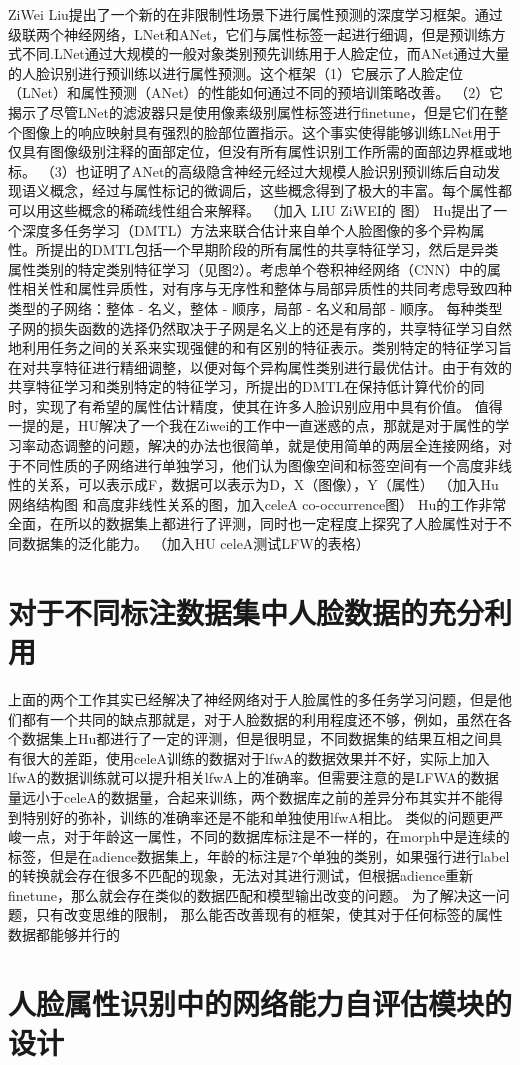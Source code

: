 ZiWei Liu提出了一个新的在非限制性场景下进行属性预测的深度学习框架。通过级联两个神经网络，LNet和ANet，它们与属性标签一起进行细调，但是预训练方式不同.LNet通过大规模的一般对象类别预先训练用于人脸定位，而ANet通过大量的人脸识别进行预训练以进行属性预测。这个框架（1）它展示了人脸定位（LNet）和属性预测（ANet）的性能如何通过不同的预培训策略改善。 （2）它揭示了尽管LNet的滤波器只是使用像素级别属性标签进行finetune，但是它们在整个图像上的响应映射具有强烈的脸部位置指示。这个事实使得能够训练LNet用于仅具有图像级别注释的面部定位，但没有所有属性识别工作所需的面部边界框或地标。 （3）也证明了ANet的高级隐含神经元经过大规模人脸识别预训练后自动发现语义概念，经过与属性标记的微调后，这些概念得到了极大的丰富。每个属性都可以用这些概念的稀疏线性组合来解释。
（加入 LIU ZiWEI的 图）
Hu提出了一个深度多任务学习（DMTL）方法来联合估计来自单个人脸图像的多个异构属性。所提出的DMTL包括一个早期阶段的所有属性的共享特征学习，然后是异类属性类别的特定类别特征学习（见图2）。考虑单个卷积神经网络（CNN）中的属性相关性和属性异质性，对有序与无序性和整体与局部异质性的共同考虑导致四种类型的子网络：整体 - 名义，整体 - 顺序，局部 - 名义和局部 - 顺序。 每种类型子网的损失函数的选择仍然取决于子网是名义上的还是有序的，共享特征学习自然地利用任务之间的关系来实现强健的和有区别的特征表示。类别特定的特征学习旨在对共享特征进行精细调整，以便对每个异构属性类别进行最优估计。由于有效的共享特征学习和类别特定的特征学习，所提出的DMTL在保持低计算代价的同时，实现了有希望的属性估计精度，使其在许多人脸识别应用中具有价值。
值得一提的是，HU解决了一个我在Ziwei的工作中一直迷惑的点，那就是对于属性的学习率动态调整的问题，解决的办法也很简单，就是使用简单的两层全连接网络，对于不同性质的子网络进行单独学习，他们认为图像空间和标签空间有一个高度非线性的关系，可以表示成F，数据可以表示为D，X（图像），Y（属性）
（加入Hu 网络结构图 和高度非线性关系的图，加入celeA co-occurrence图）
Hu的工作非常全面，在所以的数据集上都进行了评测，同时也一定程度上探究了人脸属性对于不同数据集的泛化能力。
（加入HU celeA测试LFW的表格）

\section{对于不同标注数据集中人脸数据的充分利用}
上面的两个工作其实已经解决了神经网络对于人脸属性的多任务学习问题，但是他们都有一个共同的缺点那就是，对于人脸数据的利用程度还不够，例如，虽然在各个数据集上Hu都进行了一定的评测，但是很明显，不同数据集的结果互相之间具有很大的差距，使用celeA训练的数据对于lfwA的数据效果并不好，实际上加入lfwA的数据训练就可以提升相关lfwA上的准确率。但需要注意的是LFWA的数据量远小于celeA的数据量，合起来训练，两个数据库之前的差异分布其实并不能得到特别好的弥补，训练的准确率还是不能和单独使用lfwA相比。
类似的问题更严峻一点，对于年龄这一属性，不同的数据库标注是不一样的，在morph中是连续的标签，但是在adience数据集上，年龄的标注是7个单独的类别，如果强行进行label的转换就会存在很多不匹配的现象，无法对其进行测试，但根据adience重新finetune，那么就会存在类似的数据匹配和模型输出改变的问题。
为了解决这一问题，只有改变思维的限制，
那么能否改善现有的框架，使其对于任何标签的属性数据都能够并行的



\section{人脸属性识别中的网络能力自评估模块的设计}

